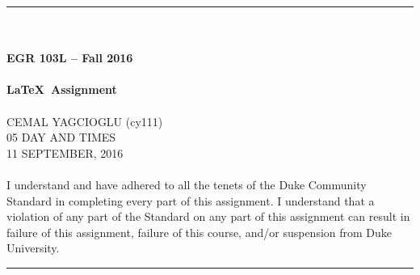 \documentclass{article}
\begin{document}
\begin{center}
\rule{6.5in}{0.5mm}\\~\\
{\bf \large EGR 103L -- Fall 2016}\\~\\
{\huge \bf \LaTeX~Assignment}\\~\\
CEMAL YAGCIOGLU (cy111)\\
05 DAY AND TIMES\\
11 SEPTEMBER, 2016\\~\\ 
{\small I understand and have adhered to all the tenets of the Duke
  Community Standard in completing every part of this assignment.  I
  understand that a violation of any part of the Standard on any part
  of this assignment can result in failure of this assignment, failure
  of this course, and/or suspension from Duke University.} 
\rule{6.5in}{0.5mm}\\
\end{center}
\tableofcontents
\listoffigures
\pagebreak
\end{document}
